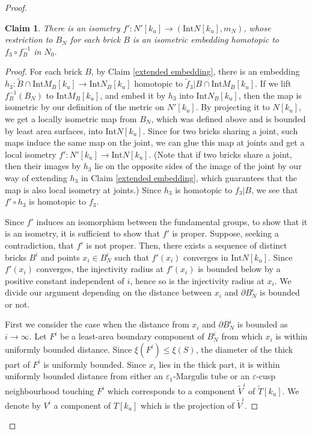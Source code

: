 \documentclass{amsart}
\newtheorem{claim}[theorem]{Claim}
\theoremstyle{definition}
\numberwithin{figure}{section}
\numberwithin{equation}{section}
\def\Int{\mathrm{Int}}
\begin{document}
\begin{proof}
\begin{claim}
\label{isometric N}
There is an isometry $f' : N'[k_u] \rightarrow (\Int N[k_u], m_N)$, whose restriction to $B_N$ for each brick $B$ is an isometric embedding homotopic to $f_3 \circ f_B^{-1}$ in $N_0$.
\end{claim}
\begin{proof}
For each brick $B$, by Claim \ref{extended embedding}, there is an embedding $h_3: \tilde B \cap \Int M_B[k_u]\rightarrow \Int N_B[k_u]$ homotopic to $\tilde f_3|B \cap \Int M_B[k_u]$.
If we  lift $f_B^{-1}(B_N)$ to $\Int M_B[k_u]$, and embed it by $h_3$ into $\Int N_B[k_u]$, then the map is isometric by our definition of the metric on $N'[k_u]$.
By projecting it to $N[k_u]$, we get a locally isometric map from $B_N$, which was defined above and is bounded by least area surfaces, into $\Int N[k_u]$.
Since for two bricks sharing a joint, such maps induce the same map on the joint, we can glue this map at joints and get a local isometry $f' : N'[k_u] \rightarrow \Int N[k_u]$.
(Note that if two bricks share a joint, then their images by $h_3$ lie on the opposite sides of the image of the joint by our way of extending $h_3$ in Claim \ref{extended embedding}, which guarantees that the map is also local isometry at joints.)
Since $h_3$ is homotopic to $f_3|B$, we see that $f' \circ h_3$ is homotopic to $f_3$.

Since $f'$ induces an isomorphism between the fundamental groups, to show that it is an isometry, it is sufficient to show that $f'$ is proper.
Suppose, seeking a contradiction, that $f'$ is not proper.
Then, there exists a sequence of distinct bricks $B^i$ and points $x_i \in B^i_N$ such that $f'(x_i)$ converges in $\Int N[k_u]$.
Since $f'(x_i)$ converges, the injectivity radius at $f'(x_i)$ is bounded below by a positive constant independent of $i$, hence so is the injectivity radius at $x_i$.
We divide our argument depending on the distance between $x_i$ and $\partial B^i_N$ is bounded or not.

First we consider the case when the distance from $x_i$ and $\partial B^i_N$ is bounded as $i \rightarrow \infty$.
Let $F^i$ be a least-area boundary component of $B^i_N$ from which $x_i$ is within uniformly bounded distance.
Since $\xi(F^i) \leq \xi(S)$, the diameter of the thick part of $F^i$ is uniformly bounded.
Since $x_i$ lies in the thick part, it is within uniformly bounded distance from either an $\varepsilon_1$-Margulis tube or an $\varepsilon$-cusp neighbourhood touching $F^i$ which corresponds to a component $\tilde V^i$ of $\tilde T[k_u]$.
We denote by $V^i$   a component of $T[k_u]$ which is the projection of $\tilde V^i$.


\end{proof}
\end{proof}
\end{document}
